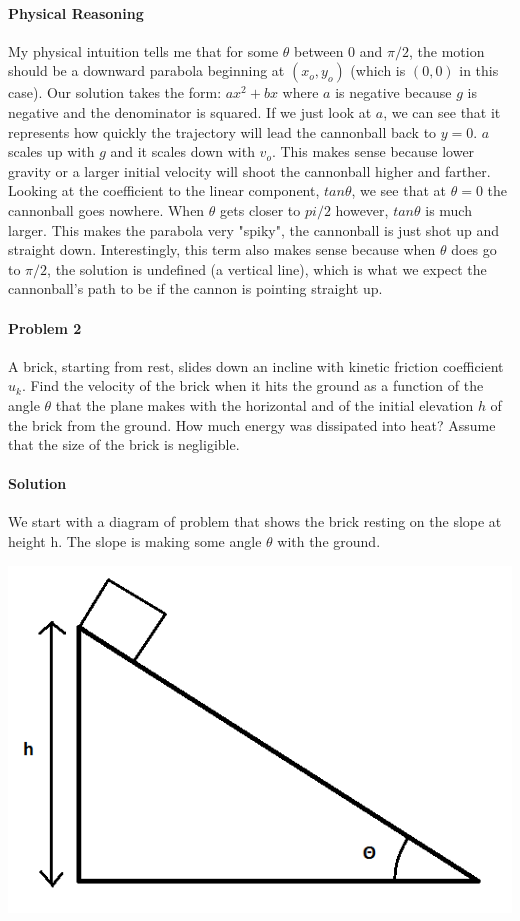 \documentclass[11pt,a4paper]{report}
\begin{document}
\paragraph{Physical Reasoning} My physical intuition tells me that for some $\theta$ between $0$ and $\pi/2$, the motion should be a downward parabola beginning at $(x_o, y_o)$ (which is $(0, 0)$ in this case). Our solution takes the form: $ax^2 + bx$ where $a$ is negative because $g$ is negative and the denominator is squared. If we just look at $a$, we can see that it represents how quickly the trajectory will lead the cannonball back to $y = 0$. $a$ scales up with $g$ and it scales down with $v_o$. This makes sense because lower gravity or a larger initial velocity will shoot the cannonball higher and farther. Looking at the coefficient to the linear component, $tan\theta$, we see that at $\theta = 0$ the cannonball goes nowhere. When $\theta$ gets closer to $pi/2$ however, $tan\theta$ is much larger. This makes the parabola very "spiky", the cannonball is just shot up and straight down. Interestingly, this term also makes sense because when $\theta$ does go to $\pi/2$, the solution is undefined (a vertical line), which is what we expect the cannonball's path to be if the cannon is pointing straight up.

\paragraph{Problem 2} A brick, starting from rest, slides down an incline with kinetic friction coefficient $u_k$. Find the velocity of the brick when it hits the ground as a function of the angle $\theta$ that the plane makes with the horizontal and of the initial elevation $h$ of the brick from the ground. How much energy was dissipated into heat? Assume that the size of the brick is negligible.

\paragraph{Solution}We start with a diagram of problem that shows the brick resting on the slope at height h. The slope is making some angle $\theta$ with the ground.
\begin{center}
\includegraphics[scale=0.5]{ramp}
\end{center}
\end{document}
